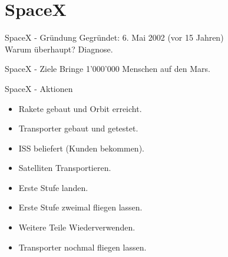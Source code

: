 

\section{SpaceX}

\begin{frame}[c]{SpaceX - Gründung}
    \Large
    Gegründet: 6. Mai 2002 (vor 15 Jahren) \\ \pause
    Warum überhaupt? \pause
    Diagnose.
\end{frame}

\begin{frame}[c]{SpaceX - Ziele}
    \Large
    Bringe 1'000'000 Menschen auf den Mars.
\end{frame}


\begin{frame}[c]{SpaceX - Aktionen}
    \Large
    \begin{itemize}
        \item Rakete gebaut und Orbit erreicht.
            \pause
        \item Transporter gebaut und getestet.
            \pause
        \item ISS beliefert (Kunden bekommen).
            \pause
        \item Satelliten Transportieren.
            \pause
        \item Erste Stufe landen.
            \pause
        \item Erste Stufe zweimal fliegen lassen.
            \pause
        \item Weitere Teile Wiederverwenden.
            \pause
        \item Transporter nochmal fliegen lassen.
    \end{itemize}
\end{frame}




